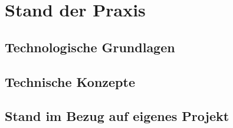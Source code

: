 \chapter{Stand der Praxis}
\label{ch:StandDerPraxis}


\section{Technologische Grundlagen}

\section{Technische Konzepte}
\label{sec:technischeKonzepte}

\section{Stand im Bezug auf eigenes Projekt}
